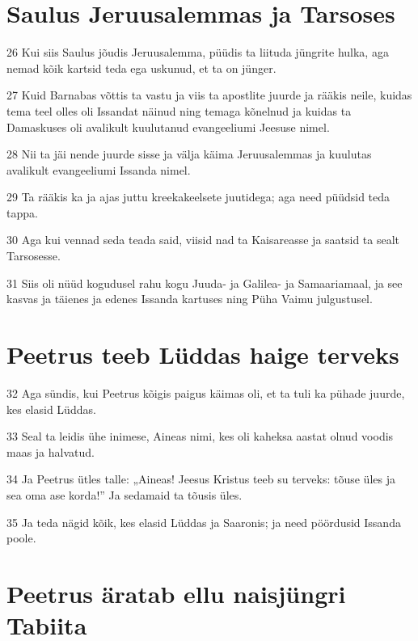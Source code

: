 \section*{Saulus Jeruusalemmas ja Tarsoses}

\par 26 Kui siis Saulus jõudis Jeruusalemma, püüdis ta liituda jüngrite hulka, aga nemad kõik kartsid teda ega uskunud, et ta on jünger.
\par 27 Kuid Barnabas võttis ta vastu ja viis ta apostlite juurde ja rääkis neile, kuidas tema teel olles oli Issandat näinud ning temaga kõnelnud ja kuidas ta Damaskuses oli avalikult kuulutanud evangeeliumi Jeesuse nimel.
\par 28 Nii ta jäi nende juurde sisse ja välja käima Jeruusalemmas ja kuulutas avalikult evangeeliumi Issanda nimel.
\par 29 Ta rääkis ka ja ajas juttu kreekakeelsete juutidega; aga need püüdsid teda tappa.
\par 30 Aga kui vennad seda teada said, viisid nad ta Kaisareasse ja saatsid ta sealt Tarsosesse.
\par 31 Siis oli nüüd kogudusel rahu kogu Juuda- ja Galilea- ja Samaariamaal, ja see kasvas ja täienes ja edenes Issanda kartuses ning Püha Vaimu julgustusel.

\section*{Peetrus teeb Lüddas haige terveks}

\par 32 Aga sündis, kui Peetrus kõigis paigus käimas oli, et ta tuli ka pühade juurde, kes elasid Lüddas.
\par 33 Seal ta leidis ühe inimese, Aineas nimi, kes oli kaheksa aastat olnud voodis maas ja halvatud.
\par 34 Ja Peetrus ütles talle: „Aineas! Jeesus Kristus teeb su terveks: tõuse üles ja sea oma ase korda!” Ja sedamaid ta tõusis üles.
\par 35 Ja teda nägid kõik, kes elasid Lüddas ja Saaronis; ja need pöördusid Issanda poole.

\section*{Peetrus äratab ellu naisjüngri Tabiita}

